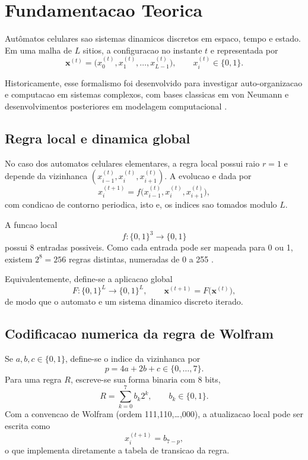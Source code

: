 \chapter{Fundamentacao Teorica}
\label{chap_fundamentacao_teorica}

Autômatos celulares sao sistemas dinamicos discretos em espaco, tempo e estado. Em uma malha de \(L\) sitios, a configuracao no instante \(t\) e representada por
\[
\mathbf{x}^{(t)} = \big(x_0^{(t)},x_1^{(t)},\dots,x_{L-1}^{(t)}\big),
\qquad x_i^{(t)}\in\{0,1\}.
\]

Historicamente, esse formalismo foi desenvolvido para investigar auto-organizacao e computacao em sistemas complexos, com bases classicas em von Neumann e desenvolvimentos posteriores em modelagem computacional \cite{vonneumann1966,toffoli1987,chopard1998,ilachinski2001}.

\section{Regra local e dinamica global}

No caso dos automatos celulares elementares, a regra local possui raio \(r=1\) e depende da vizinhanca
\((x_{i-1}^{(t)},x_i^{(t)},x_{i+1}^{(t)})\). A evolucao e dada por
\[
x_i^{(t+1)} = f\big(x_{i-1}^{(t)},x_i^{(t)},x_{i+1}^{(t)}\big),
\]
com condicao de contorno periodica, isto e, os indices sao tomados modulo \(L\).

A funcao local
\[
f:\{0,1\}^3\to\{0,1\}
\]
possui 8 entradas possiveis. Como cada entrada pode ser mapeada para 0 ou 1, existem
\(2^8=256\) regras distintas, numeradas de 0 a 255 \cite{wolfram1983,wolfram2002}.

Equivalentemente, define-se a aplicacao global
\[
F:\{0,1\}^L\to\{0,1\}^L,
\qquad \mathbf{x}^{(t+1)} = F\big(\mathbf{x}^{(t)}\big),
\]
de modo que o automato e um sistema dinamico discreto iterado.

\section{Codificacao numerica da regra de Wolfram}

Se \(a,b,c\in\{0,1\}\), define-se o indice da vizinhanca por
\[
p = 4a + 2b + c \in \{0,\dots,7\}.
\]
Para uma regra \(R\), escreve-se sua forma binaria com 8 bits,
\[
R = \sum_{k=0}^{7} b_k 2^k,
\qquad b_k\in\{0,1\}.
\]
Com a convencao de Wolfram (ordem 111,110,\dots,000), a atualizacao local pode ser escrita como
\[
x_i^{(t+1)} = b_{7-p},
\]
o que implementa diretamente a tabela de transicao da regra.

